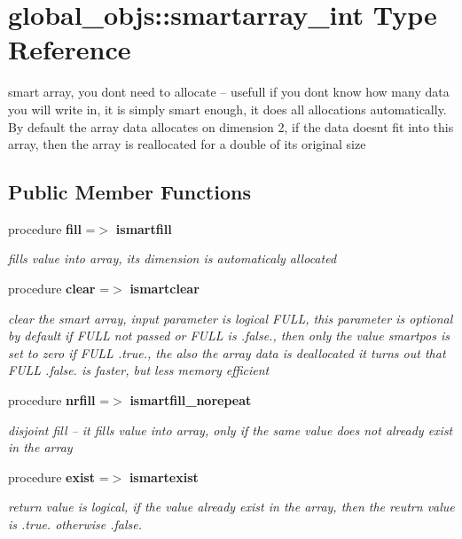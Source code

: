 \section{global\+\_\+objs\+:\+:smartarray\+\_\+int Type Reference}
\label{structglobal__objs_1_1smartarray__int}


smart array, you don\textquotesingle{}t need to allocate -- usefull if you don\textquotesingle{}t know how many data you will write in, it is simply smart enough, it does all allocations automatically. By default the array data allocates on dimension 2, if the data doesn\textquotesingle{}t fit into this array, then the array is reallocated for a double of its original size  


\subsection*{Public Member Functions}
\begin{DoxyCompactItemize}
\item 
procedure {\bf fill} =$>$ {\bf ismartfill}
\begin{DoxyCompactList}\small\item\em fills value into array, its dimension is automaticaly allocated \end{DoxyCompactList}\item 
procedure {\bf clear} =$>$ {\bf ismartclear}
\begin{DoxyCompactList}\small\item\em clear the smart array, input parameter is logical F\+U\+LL, this parameter is optional by default if F\+U\+LL not passed or F\+U\+LL is .false., then only the value smartpos is set to zero if F\+U\+LL .true., the also the array data is deallocated it turns out that F\+U\+LL .false. is faster, but less memory efficient \end{DoxyCompactList}\item 
procedure {\bf nrfill} =$>$ {\bf ismartfill\+\_\+norepeat}
\begin{DoxyCompactList}\small\item\em disjoint fill -- it fills value into array, only if the same value does not already exist in the array \end{DoxyCompactList}\item 
procedure {\bf exist} =$>$ {\bf ismartexist}
\begin{DoxyCompactList}\small\item\em return value is logical, if the value already exist in the array, then the reutrn value is .true. otherwise .false. \end{DoxyCompactList}\end{DoxyCompactItemize}
